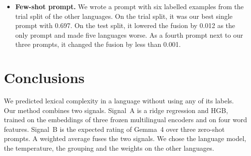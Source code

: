 \begin{itemize}
CompLex data and tested on 2{,}827 MLSP 2024 instances. The best of 14 runs fine-tuning the whole
encoder reached 0.461. This was against 0.551 with the encoder frozen. The best of six LoRA runs %
reached 0.462. This was against 0.515. %
\item \textbf{Few-shot prompt.} We wrote a prompt with six labelled examples from the trial split %
of the other languages. On the trial split, it was our best single prompt with 0.697. On the test %
split, it lowered the fusion by 0.012 as the only prompt and made five languages worse. As a fourth %
prompt next to our three prompts, it changed the fusion by less than 0.001. %
\end{itemize}

\section{Conclusions}
\label{sec:conclusions}

We predicted lexical complexity in a language without using any of its labels. Our method combines
two signals. Signal~A is a ridge regression and HGB, trained on the embeddings of three frozen %
multilingual encoders and on four word features. Signal~B is the expected rating of Gemma~4 over %
three zero-shot prompts. A weighted average fuses the two signals. We chose the language model, the %
temperature, the grouping and the weights on the other languages.

